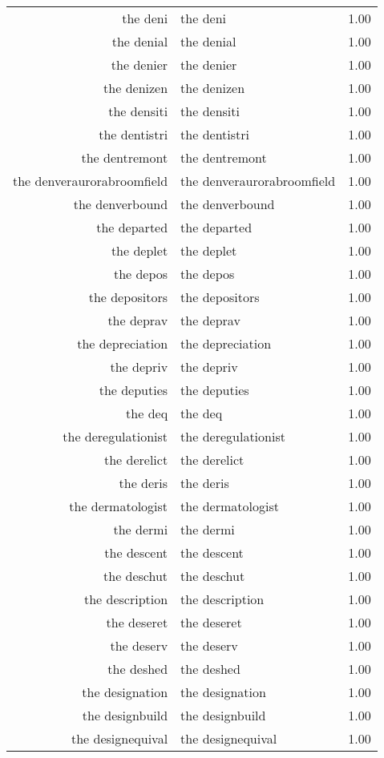 \begin{table}[ht]
\begin{tabular}{rlr}
  the deni & the deni & 1.00 \\ 
  the denial & the denial & 1.00 \\ 
  the denier & the denier & 1.00 \\ 
  the denizen & the denizen & 1.00 \\ 
  the densiti & the densiti & 1.00 \\ 
  the dentistri & the dentistri & 1.00 \\ 
  the dentremont & the dentremont & 1.00 \\ 
  the denveraurorabroomfield & the denveraurorabroomfield & 1.00 \\ 
  the denverbound & the denverbound & 1.00 \\ 
  the departed & the departed & 1.00 \\ 
  the deplet & the deplet & 1.00 \\ 
  the depos & the depos & 1.00 \\ 
  the depositors & the depositors & 1.00 \\ 
  the deprav & the deprav & 1.00 \\ 
  the depreciation & the depreciation & 1.00 \\ 
  the depriv & the depriv & 1.00 \\ 
  the deputies & the deputies & 1.00 \\ 
  the deq & the deq & 1.00 \\ 
  the deregulationist & the deregulationist & 1.00 \\ 
  the derelict & the derelict & 1.00 \\ 
  the deris & the deris & 1.00 \\ 
  the dermatologist & the dermatologist & 1.00 \\ 
  the dermi & the dermi & 1.00 \\ 
  the descent & the descent & 1.00 \\ 
  the deschut & the deschut & 1.00 \\ 
  the description & the description & 1.00 \\ 
  the deseret & the deseret & 1.00 \\ 
  the deserv & the deserv & 1.00 \\ 
  the deshed & the deshed & 1.00 \\ 
  the designation & the designation & 1.00 \\ 
  the designbuild & the designbuild & 1.00 \\ 
  the designequival & the designequival & 1.00 \\ 

\end{tabular}
\end{table}
